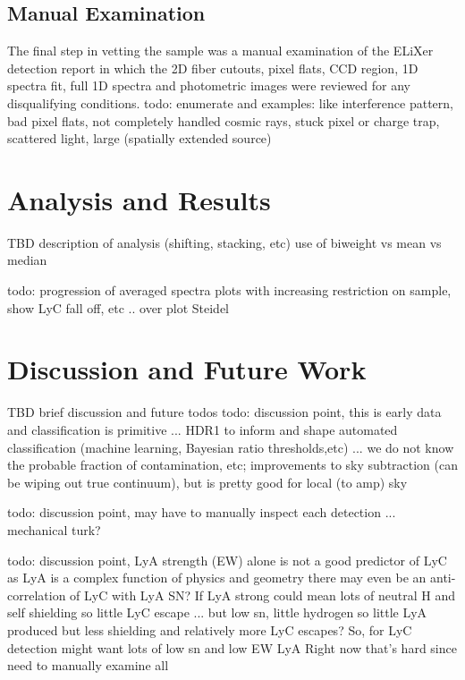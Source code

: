 \documentclass{aastex62}
\begin{document}
\subsection{Manual Examination}
The final step in vetting the sample was a manual examination of the ELiXer detection report in which the 2D fiber cutouts, pixel flats, CCD region, 1D spectra fit, full 1D spectra and photometric images were reviewed for any disqualifying conditions. 
{ \color{red} todo: enumerate and examples: like interference pattern, bad pixel flats, not completely handled cosmic rays, stuck pixel or charge trap, scattered light, large (spatially extended source) }


\section{Analysis and Results} \label{sec:analysis}

TBD description of analysis (shifting, stacking, etc) use of biweight vs mean vs median

{ \color{red} todo: progression of averaged spectra plots with increasing restriction on sample, show LyC fall off, etc .. over plot Steidel}


\section{Discussion and Future Work} \label{sec:discussion}
TBD brief discussion and future todos
{ \color{red} todo: discussion point, this is early data and classification is primitive ... HDR1 to inform and shape automated classification (machine learning, Bayesian ratio thresholds,etc) ... we do not know the probable fraction of contamination, etc; improvements to sky subtraction (can be wiping out true continuum), but is pretty good for local (to amp) sky}

{ \color{red} todo: discussion point, may have to manually inspect each detection ... mechanical turk?}

{ \color{red} todo: discussion point, LyA strength (EW) alone is not a good predictor of LyC as LyA is a complex function of physics and geometry there may even be an anti-correlation of LyC with LyA SN? If LyA strong could mean lots of neutral H and self shielding so little LyC escape ... but low sn, little hydrogen so little LyA produced but less shielding and relatively more LyC escapes?  So, for LyC detection might want lots of low sn and low EW LyA
Right now that's hard since need to manually examine all }
\end{document}
